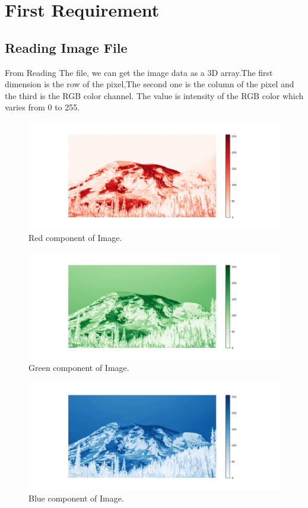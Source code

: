 \chapter{First Requirement}
\section{Reading Image File}
From Reading The file, we can get the image data as a 3D array.The first dimension is the row of the pixel,The second one is the column of the pixel and the third is the RGB color channel. The value is intensity of the RGB color which varies from 0 to 255.
\vspace{20pt}

\begin{figure}[h]
    \centering
    \includegraphics[width=1\textwidth]{"../Image Components/a_red.png"}
    \caption{Red component of Image.}
    \label{fig:red_component_plot}
\end{figure}
\begin{figure}[h]
    \centering
    \includegraphics[width=1\textwidth]{"../Image Components/a_green.png"}
    \caption{Green component of Image.}
    \label{fig:green_component_plot}
\end{figure}
\begin{figure}[h]
    \centering
    \includegraphics[width=1\textwidth]{"../Image Components/a_blue.png"}
    \caption{Blue component of Image.}
    \label{fig:blue_component_plot}
\end{figure}